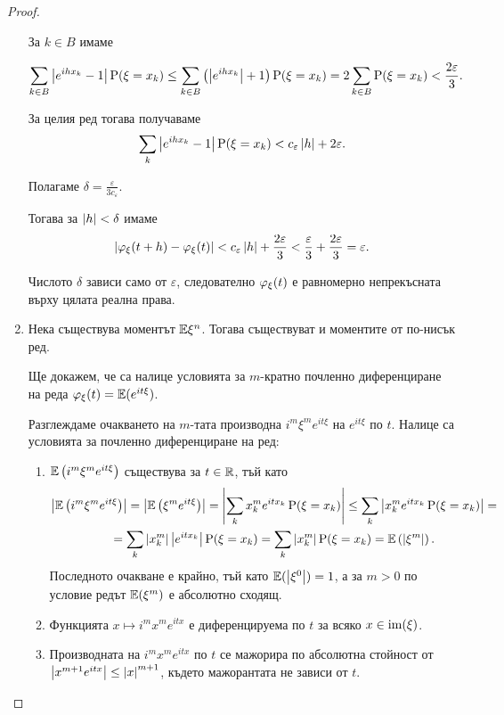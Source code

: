 \documentclass[numbers=endperiod, DIV=15, bibliography=totocnumbered]{scrartcl}
\begin{document}
\begin{proof}
\begin{enumerate}
    За $k \in B$ имаме

    \begin{displaymath}
      \sum_{k \in B} \left\vert e^{ih x_k} - 1 \right\vert \operatorname{P}(\xi = x_k)
      \leq
      \sum_{k \in B} \left( \left\vert e^{ih x_k} \right\vert + 1 \right) \operatorname{P}(\xi = x_k)
      =
      2 \sum_{k \in B} \operatorname{P}(\xi = x_k)
      <
      \frac {2\varepsilon} 3.
    \end{displaymath}

    За целия ред тогава получаваме
    \begin{displaymath}
      \sum_k \left\vert e^{ih x_k} - 1 \right\vert \operatorname{P}(\xi = x_k)
      <
      c_\varepsilon \left\vert h \right\vert + 2 \varepsilon.
    \end{displaymath}

    Полагаме $\delta = \frac \varepsilon {3 c_\varepsilon}$.

    Тогава за $\left\vert h \right\vert < \delta$ имаме
    \begin{displaymath}
      \left\vert \varphi_\xi(t + h) - \varphi_\xi(t) \right\vert
      <
      c_\varepsilon \left\vert h \right\vert + \frac {2\varepsilon} 3
      <
      \frac {\varepsilon} 3 + \frac {2\varepsilon} 3
      =
      \varepsilon.
    \end{displaymath}

    Числото $\delta$ зависи само от $\varepsilon$, следователно $\varphi_\xi(t)$ е равномерно непрекъсната върху цялата реална права.

    \item Нека съществува моментът $\mathbb{E} \xi^n$. Тогава съществуват и моментите от по-нисък ред.

    Ще докажем, че са налице условията за $m$-кратно почленно диференциране на реда $\varphi_\xi(t) = \mathbb{E} (e^{it \xi})$.

    Разглеждаме очакването на $m$-тата производна $i^m \xi^m e^{it \xi}$ на $e^{it \xi}$ по $t$. Налице са условията за почленно диференциране на ред:
    \begin{enumerate}
      \item $\mathbb{E} \left( i^m \xi^m e^{it \xi} \right)$ съществува за $t \in \mathbb{R}$, тъй като
      \begin{multline*}
        \left\vert \mathbb{E} \left( i^m \xi^m e^{it \xi} \right) \right\vert
        =
        \left\vert \mathbb{E} \left( \xi^m e^{it \xi} \right) \right\vert
        =
        \left\vert \sum_k x_k^m e^{it x_k} \operatorname{P}(\xi = x_k) \right\vert
        \leq
        \sum_k \left\vert x_k^m e^{it x_k} \operatorname{P}(\xi = x_k) \right\vert
        = \\ =
        \sum_k \left\vert x_k^m \right\vert \left\vert e^{it x_k} \right\vert \operatorname{P}(\xi = x_k)
        =
        \sum_k \left\vert x_k^m \right\vert \operatorname{P}(\xi = x_k)
        =
        \mathbb{E} \left( {\left\vert \xi^m \right\vert} \right).
      \end{multline*}
      Последното очакване е крайно, тъй като $\mathbb{E}(\left\vert \xi^0 \right\vert) = 1$, а за $m > 0$ по условие редът $\mathbb{E}(\xi^m)$ е абсолютно сходящ.
      \item Функцията $x \mapsto i^m x^m e^{it x}$ е диференцируема по $t$ за всяко $x \in \operatorname{im}(\xi)$.
      \item Производната на $i^m x^m e^{it x}$ по $t$ се мажорира по абсолютна стойност от $\left\vert x^{m+1} e^{it x} \right\vert \leq {\left\vert x \right\vert}^{m+1}$, където мажорантата не зависи от $t$.
    \end{enumerate}


\end{enumerate}
\end{proof}
\end{document}
